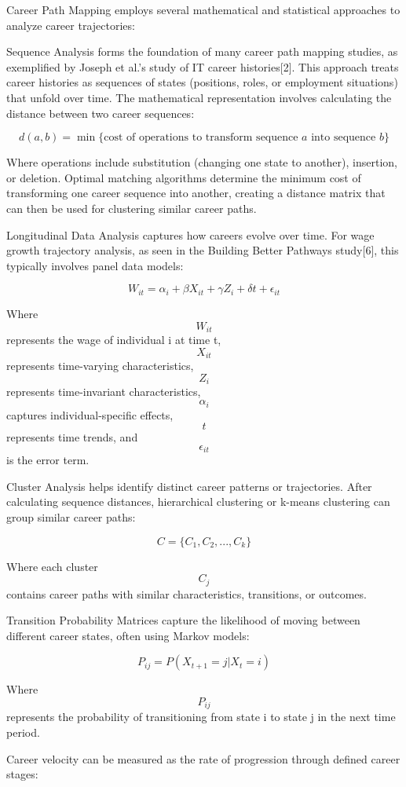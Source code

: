\documentclass[./main.tex]{subfiles}
\begin{document}
Career Path Mapping employs several mathematical and statistical
approaches to analyze career trajectories:

Sequence Analysis forms the foundation of many career path mapping
studies, as exemplified by Joseph et al.'s study of IT career
histories{[}2{]}. This approach treats career histories as sequences of
states (positions, roles, or employment situations) that unfold over
time. The mathematical representation involves calculating the distance
between two career sequences:

\[ d(a, b) = \min \{\text{cost of operations to transform sequence } a \text{ into sequence } b\} \]

Where operations include substitution (changing one state to another),
insertion, or deletion. Optimal matching algorithms determine the
minimum cost of transforming one career sequence into another, creating
a distance matrix that can then be used for clustering similar career
paths.

Longitudinal Data Analysis captures how careers evolve over time. For
wage growth trajectory analysis, as seen in the Building Better Pathways
study{[}6{]}, this typically involves panel data models:

\[ W_{it} = \alpha_i + \beta X_{it} + \gamma Z_i + \delta t + \epsilon_{it} \]

Where \[W_{it}\] represents the wage of individual i at time t,
\[X_{it}\] represents time-varying characteristics, \[Z_i\] represents
time-invariant characteristics, \[\alpha_i\] captures
individual-specific effects, \[t\] represents time trends, and
\[\epsilon_{it}\] is the error term.

Cluster Analysis helps identify distinct career patterns or
trajectories. After calculating sequence distances, hierarchical
clustering or k-means clustering can group similar career paths:

\[ C = \{C_1, C_2, ..., C_k\} \]

Where each cluster \[C_j\] contains career paths with similar
characteristics, transitions, or outcomes.

Transition Probability Matrices capture the likelihood of moving between
different career states, often using Markov models:

\[ P_{ij} = P(X_{t+1} = j | X_t = i) \]

Where \[P_{ij}\] represents the probability of transitioning from state
i to state j in the next time period.

Career velocity can be measured as the rate of progression through
defined career stages:
\end{document}
